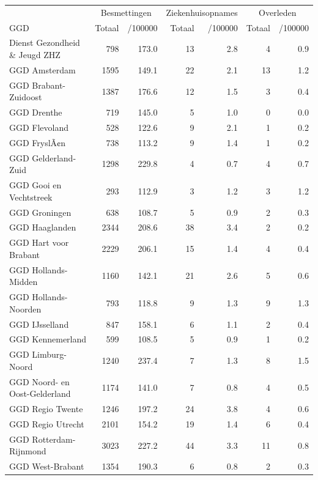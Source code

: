 \documentclass[
  english,
  man,floatsintext]{apa6}
\begin{document}
\begin{table}
\centering\begingroup\fontsize{10}{12}\selectfont

\begin{threeparttable}
\begin{tabular}{lrrrrrr}
\toprule
\multicolumn{1}{c}{ } & \multicolumn{2}{c}{Besmettingen} & \multicolumn{2}{c}{Ziekenhuisopnames} & \multicolumn{2}{c}{Overleden} \\
\cmidrule(l{3pt}r{3pt}){2-3} \cmidrule(l{3pt}r{3pt}){4-5} \cmidrule(l{3pt}r{3pt}){6-7}
GGD & Totaal & /100000 & Totaal & /100000 & Totaal & /100000\\
\midrule
Dienst Gezondheid \& Jeugd ZHZ & 798 & 173.0 & 13 & 2.8 & 4 & 0.9\\
GGD Amsterdam & 1595 & 149.1 & 22 & 2.1 & 13 & 1.2\\
GGD Brabant-Zuidoost & 1387 & 176.6 & 12 & 1.5 & 3 & 0.4\\
GGD Drenthe & 719 & 145.0 & 5 & 1.0 & 0 & 0.0\\
GGD Flevoland & 528 & 122.6 & 9 & 2.1 & 1 & 0.2\\
GGD FryslÃ¢n & 738 & 113.2 & 9 & 1.4 & 1 & 0.2\\
GGD Gelderland-Zuid & 1298 & 229.8 & 4 & 0.7 & 4 & 0.7\\
GGD Gooi en Vechtstreek & 293 & 112.9 & 3 & 1.2 & 3 & 1.2\\
GGD Groningen & 638 & 108.7 & 5 & 0.9 & 2 & 0.3\\
GGD Haaglanden & 2344 & 208.6 & 38 & 3.4 & 2 & 0.2\\
GGD Hart voor Brabant & 2229 & 206.1 & 15 & 1.4 & 4 & 0.4\\
GGD Hollands-Midden & 1160 & 142.1 & 21 & 2.6 & 5 & 0.6\\
GGD Hollands-Noorden & 793 & 118.8 & 9 & 1.3 & 9 & 1.3\\
GGD IJsselland & 847 & 158.1 & 6 & 1.1 & 2 & 0.4\\
GGD Kennemerland & 599 & 108.5 & 5 & 0.9 & 1 & 0.2\\
GGD Limburg-Noord & 1240 & 237.4 & 7 & 1.3 & 8 & 1.5\\
GGD Noord- en Oost-Gelderland & 1174 & 141.0 & 7 & 0.8 & 4 & 0.5\\
GGD Regio Twente & 1246 & 197.2 & 24 & 3.8 & 4 & 0.6\\
GGD Regio Utrecht & 2101 & 154.2 & 19 & 1.4 & 6 & 0.4\\
GGD Rotterdam-Rijnmond & 3023 & 227.2 & 44 & 3.3 & 11 & 0.8\\
GGD West-Brabant & 1354 & 190.3 & 6 & 0.8 & 2 & 0.3\\

\end{tabular}
\end{threeparttable}
\end{table}
\end{document}
